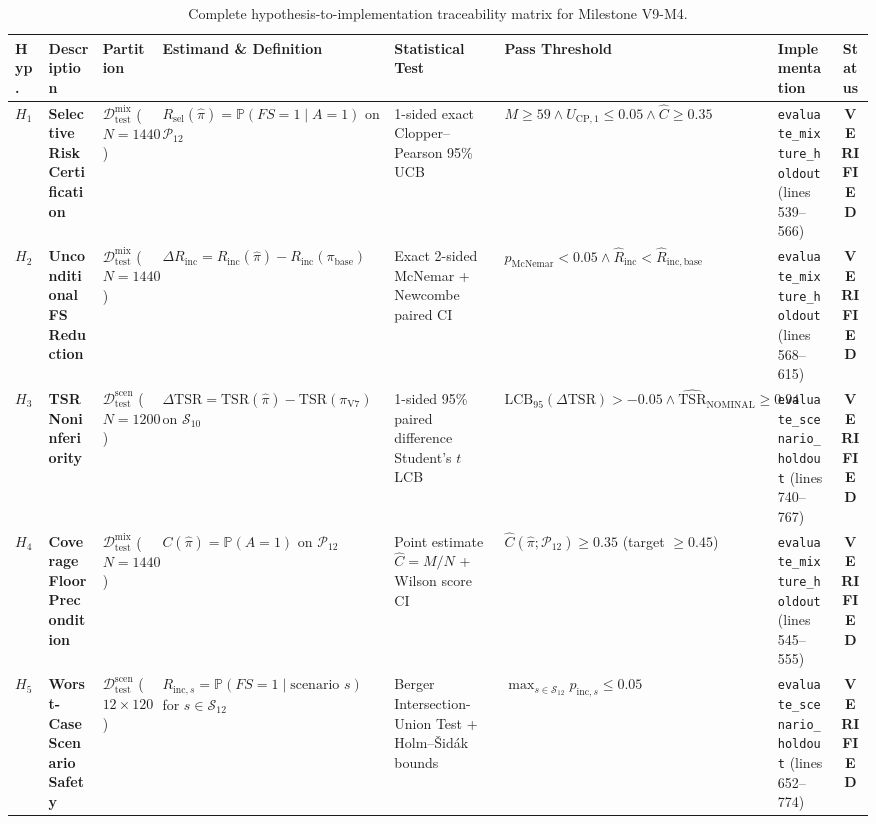 \documentclass[10pt,a4paper]{article}
\begin{document}
\begin{table}[t!]
\centering
\scriptsize
\begin{tabularx}{\textwidth}{p{0.6cm}p{1.8cm}p{1.3cm}Xp{2.2cm}p{2.3cm}p{2.1cm}c}
\toprule
\textbf{Hyp.} & \textbf{Description} & \textbf{Partition} & \textbf{Estimand \& Definition} & \textbf{Statistical Test} & \textbf{Pass Threshold} & \textbf{Implementation} & \textbf{Status} \\
\midrule
$H_1$ & \textbf{Selective Risk Certification} & $\mathcal{D}_{\mathrm{test}}^{\mathrm{mix}}$ ($N=1440$) & $R_{\mathrm{sel}}(\hat{\pi}) = \mathbb{P}(FS=1 \mid A=1)$ on $\mathcal{P}_{12}$ & 1-sided exact Clopper--Pearson 95\% UCB & $M \ge 59 \land U_{\mathrm{CP},1} \le 0.05 \land \hat{C} \ge 0.35$ & \texttt{evaluate\_mixture\_holdout} (lines 539--566) & \textbf{VERIFIED} \\
\addlinespace
$H_2$ & \textbf{Unconditional FS Reduction} & $\mathcal{D}_{\mathrm{test}}^{\mathrm{mix}}$ ($N=1440$) & $\Delta R_{\mathrm{inc}} = R_{\mathrm{inc}}(\hat{\pi}) - R_{\mathrm{inc}}(\pi_{\mathrm{base}})$ & Exact 2-sided McNemar + Newcombe paired CI & $p_{\mathrm{McNemar}} < 0.05 \land \hat{R}_{\mathrm{inc}} < \hat{R}_{\mathrm{inc, base}}$ & \texttt{evaluate\_mixture\_holdout} (lines 568--615) & \textbf{VERIFIED} \\
\addlinespace
$H_3$ & \textbf{TSR Noninferiority} & $\mathcal{D}_{\mathrm{test}}^{\mathrm{scen}}$ ($N=1200$) & $\Delta \mathrm{TSR} = \mathrm{TSR}(\hat{\pi}) - \mathrm{TSR}(\pi_{\mathrm{V7}})$ on $\mathcal{S}_{10}$ & 1-sided 95\% paired difference Student's $t$ LCB & $\mathrm{LCB}_{95}(\Delta\mathrm{TSR}) > -0.05 \land \widehat{\mathrm{TSR}}_{\mathrm{NOMINAL}} \ge 0.94$ & \texttt{evaluate\_scenario\_holdout} (lines 740--767) & \textbf{VERIFIED} \\
\addlinespace
$H_4$ & \textbf{Coverage Floor Precondition} & $\mathcal{D}_{\mathrm{test}}^{\mathrm{mix}}$ ($N=1440$) & $C(\hat{\pi}) = \mathbb{P}(A=1)$ on $\mathcal{P}_{12}$ & Point estimate $\hat{C} = M/N$ + Wilson score CI & $\hat{C}(\hat{\pi}; \mathcal{P}_{12}) \ge 0.35$ (target $\ge 0.45$) & \texttt{evaluate\_mixture\_holdout} (lines 545--555) & \textbf{VERIFIED} \\
\addlinespace
$H_5$ & \textbf{Worst-Case Scenario Safety} & $\mathcal{D}_{\mathrm{test}}^{\mathrm{scen}}$ ($12 \times 120$) & $R_{\mathrm{inc}, s} = \mathbb{P}(FS=1 \mid \text{scenario } s)$ for $s \in \mathcal{S}_{12}$ & Berger Intersection-Union Test + Holm--Šidák bounds & $\max_{s \in \mathcal{S}_{12}} p_{\mathrm{inc}, s} \le 0.05$ & \texttt{evaluate\_scenario\_holdout} (lines 652--774) & \textbf{VERIFIED} \\
\bottomrule
\end{tabularx}
\caption{Complete hypothesis-to-implementation traceability matrix for Milestone V9-M4.}
\label{tab:traceability}
\end{table}
\end{document}
